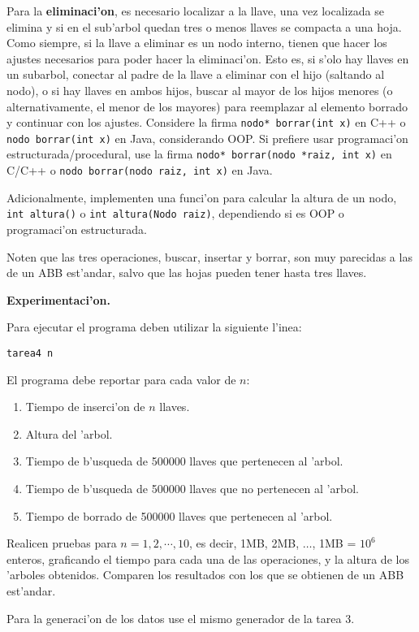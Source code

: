 \documentclass[11pt]{utalcaDoc}
\begin{document}
Para la {\bf eliminaci'on}, es necesario localizar a la llave, una vez localizada se elimina y
si en el sub'arbol quedan tres o menos llaves se compacta a una hoja.
Como siempre, si la llave a eliminar es un nodo interno, tienen que hacer los ajustes
necesarios para poder hacer la eliminaci'on. Esto es, si s'olo hay llaves
en un subarbol, conectar al padre de la llave a eliminar con el hijo (saltando al
nodo), o si hay llaves en ambos hijos, buscar al mayor de los hijos menores
(o alternativamente, el menor de los mayores) para reemplazar al elemento borrado y
continuar con los ajustes.
Considere la firma {\tt nodo* borrar(int x)} en C++ o {\tt nodo borrar(int x)} en Java,
considerando OOP.
Si prefiere usar programaci'on estructurada/procedural, use la firma
{\tt nodo* borrar(nodo *raiz, int x)} en C/C++ o {\tt nodo borrar(nodo raiz, int x)} en Java.

Adicionalmente, implementen una funci'on para calcular la altura de un nodo,
{\tt int altura()} o {\tt int altura(Nodo raiz)}, dependiendo si es OOP o programaci'on
estructurada.

Noten que las tres operaciones, buscar, insertar y borrar, son muy parecidas a las de
un ABB est'andar, salvo que las hojas pueden tener hasta tres llaves.


\textbf{Experimentaci'on.} 

Para ejecutar el programa deben utilizar la siguiente l'inea:

\verb|tarea4 n|

El programa debe reportar para cada valor de $n$:
\begin{enumerate}
\item Tiempo de inserci'on de $n$ llaves.
\item Altura del 'arbol.
\item Tiempo de b'usqueda de 500000 llaves que pertenecen al 'arbol.
\item Tiempo de b'usqueda de 500000 llaves que no pertenecen al 'arbol.
\item Tiempo de borrado de 500000 llaves que pertenecen al 'arbol.
\end{enumerate}

Realicen pruebas para $n = 1, 2, \cdots, 10$,
es decir, 1MB, 2MB, $\ldots$, 1MB = $10^{6}$ enteros,
graficando el tiempo para cada una de las operaciones, y la altura de los 'arboles
obtenidos. Comparen los resultados con los que se obtienen de un ABB est'andar.

Para la generaci'on de los datos use el mismo generador de la tarea 3.
\end{document}
